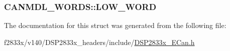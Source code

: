 \subsubsection[{L\+O\+W\+\_\+\+W\+O\+R\+D}]{ C\+A\+N\+M\+D\+L\+\_\+\+W\+O\+R\+D\+S\+::\+L\+O\+W\+\_\+\+W\+O\+R\+D}\label{struct_c_a_n_m_d_l___w_o_r_d_s_a8f865fab7385c5fcd3c0149b8416f02b}


The documentation for this struct was generated from the following file\+:\begin{DoxyCompactItemize}
\item 
f2833x/v140/\+D\+S\+P2833x\+\_\+headers/include/\hyperlink{_d_s_p2833x___e_can_8h}{D\+S\+P2833x\+\_\+\+E\+Can.\+h}\end{DoxyCompactItemize}
